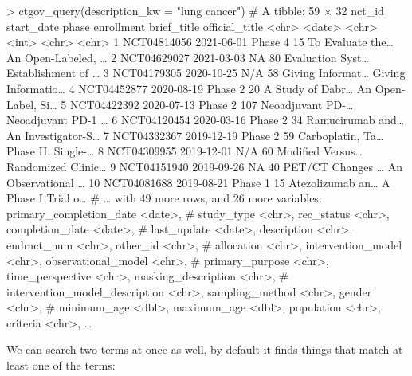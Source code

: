 \begin{example}
> ctgov_query(description_kw = "lung cancer")
# A tibble: 59 × 32
   nct_id      start_date phase   enrollment brief_title      official_title
   <chr>       <date>     <chr>        <int> <chr>            <chr>
 1 NCT04814056 2021-06-01 Phase 4         15 To Evaluate the… An Open-Labeled, …
 2 NCT04629027 2021-03-03 NA              80 Evaluation Syst… Establishment of …
 3 NCT04179305 2020-10-25 N/A             58 Giving Informat… Giving Informatio…
 4 NCT04452877 2020-08-19 Phase 2         20 A Study of Dabr… An Open-Label, Si…
 5 NCT04422392 2020-07-13 Phase 2        107 Neoadjuvant PD-… Neoadjuvant PD-1 …
 6 NCT04120454 2020-03-16 Phase 2         34 Ramucirumab and… An Investigator-S…
 7 NCT04332367 2019-12-19 Phase 2         59 Carboplatin, Ta… Phase II, Single-…
 8 NCT04309955 2019-12-01 N/A             60 Modified Versus… Randomized Clinic…
 9 NCT04151940 2019-09-26 NA              40 PET/CT Changes … An Observational …
10 NCT04081688 2019-08-21 Phase 1         15 Atezolizumab an… A Phase I Trial o…
# … with 49 more rows, and 26 more variables: primary_completion_date <date>,
#   study_type <chr>, rec_status <chr>, completion_date <date>,
#   last_update <date>, description <chr>, eudract_num <chr>, other_id <chr>,
#   allocation <chr>, intervention_model <chr>, observational_model <chr>,
#   primary_purpose <chr>, time_perspective <chr>, masking_description <chr>,
#   intervention_model_description <chr>, sampling_method <chr>, gender <chr>,
#   minimum_age <dbl>, maximum_age <dbl>, population <chr>, criteria <chr>, …
\end{example}

We can search two terms at once as well, by default it finds things that match
at least one of the terms:

